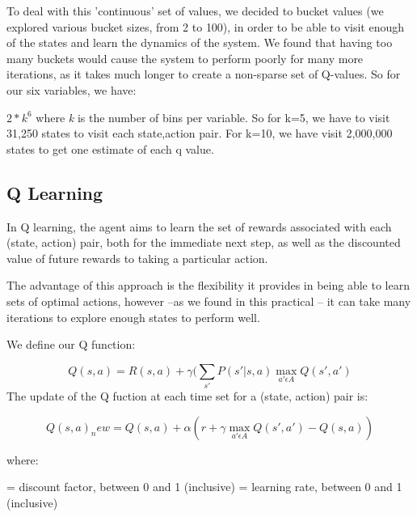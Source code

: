 \documentclass[11pt, oneside]{article}   	%
\begin{document}
\newline 

To deal with this 'continuous' set of values, we decided to bucket values (we explored various bucket sizes, from 2 to 100), in order to be able to visit enough of the states and learn the dynamics of the system. We found that having too many buckets would cause the system to perform poorly for many more iterations, as it takes much longer to create a non-sparse set of Q-values. So for our six variables, we have:

\newline
$2*k^{6}$ 
\newline
where \textit{k} is the number of bins per variable. So for k=5, we have to visit 31,250 states to visit each state,action pair. For k=10, we have visit 2,000,000 states to get one estimate of each q value.

\subsection*{Q Learning}

In Q learning, the agent aims to learn the set of rewards associated with each (state, action) pair, both for the immediate next step, as well as the discounted value of future rewards to taking a particular action.

\newline 
The advantage of this approach is the flexibility it provides in being able to learn sets of optimal actions, however --as we found in this practical -- it can take many iterations to explore enough states to perform well.

We define our Q function:
\newline

\begin{equation}\label{reio}
Q(s,a) = R(s,a) +  \gamma (\sum_{s \prime} P(s\prime | s, a) \max_{a\prime \epsilon A} Q(s \prime, a \prime)
\end{equation}
\newline
The update of the Q fuction at each time set for a (state, action) pair is:

\begin{equation}\label{reio}
Q(s,a)_new = Q(s,a) +  \alpha (r + \gamma \max_{a\prime \epsilon A} Q(s \prime, a \prime) - Q(s,a))
\end{equation}


\newline
where:

\newline
\gamma = discount factor, between 0 and 1 (inclusive)
\newline
\alpha = learning rate, between 0 and 1 (inclusive)
\newline
\end{document}
